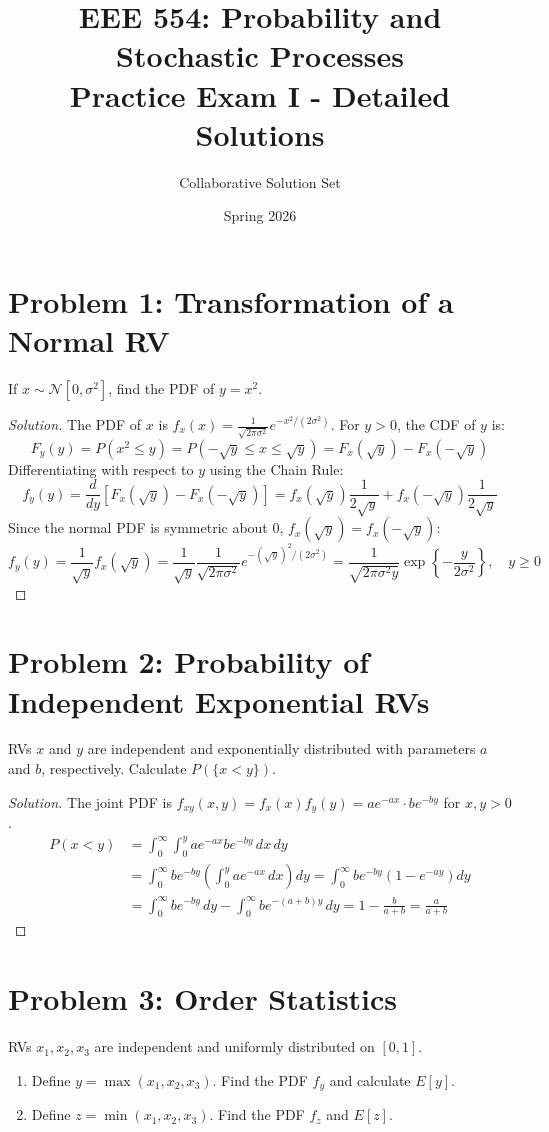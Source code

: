 \documentclass[11pt]{article}
\title{EEE 554: Probability and Stochastic Processes \\ Practice Exam I - Detailed Solutions}
\author{Collaborative Solution Set}
\date{Spring 2026}
\begin{document}
\maketitle

\section*{Problem 1: Transformation of a Normal RV}
If $x \sim \mathcal{N}[0, \sigma^{2}]$, find the PDF of $y = x^{2}$.

\begin{proof}[Solution]
The PDF of $x$ is $f_x(x) = \frac{1}{\sqrt{2\pi\sigma^2}} e^{-x^2 / (2\sigma^2)}$.
For $y > 0$, the CDF of $y$ is:
\[
F_y(y) = P(x^2 \le y) = P(-\sqrt{y} \le x \le \sqrt{y}) = F_x(\sqrt{y}) - F_x(-\sqrt{y})
\]
Differentiating with respect to $y$ using the Chain Rule:
\[
f_y(y) = \frac{d}{dy} [F_x(\sqrt{y}) - F_x(-\sqrt{y})] = f_x(\sqrt{y}) \frac{1}{2\sqrt{y}} + f_x(-\sqrt{y}) \frac{1}{2\sqrt{y}}
\]
Since the normal PDF is symmetric about 0, $f_x(\sqrt{y}) = f_x(-\sqrt{y})$:
\[
f_y(y) = \frac{1}{\sqrt{y}} f_x(\sqrt{y}) = \frac{1}{\sqrt{y}} \frac{1}{\sqrt{2\pi\sigma^2}} e^{-(\sqrt{y})^2 / (2\sigma^2)} = \frac{1}{\sqrt{2\pi\sigma^2 y}} \exp\left\{-\frac{y}{2\sigma^2}\right\}, \quad y \ge 0
\]
\end{proof}

\section*{Problem 2: Probability of Independent Exponential RVs}
RVs $x$ and $y$ are independent and exponentially distributed with parameters $a$ and $b$, respectively. Calculate $P(\{x < y\})$.

\begin{proof}[Solution]
The joint PDF is $f_{xy}(x, y) = f_x(x)f_y(y) = a e^{-ax} \cdot b e^{-by}$ for $x, y > 0$.
\begin{align*}
P(x < y) &= \int_0^\infty \int_0^y a e^{-ax} b e^{-by} \, dx \, dy \\
&= \int_0^\infty b e^{-by} \left( \int_0^y a e^{-ax} \, dx \right) dy = \int_0^\infty b e^{-by} \left( 1 - e^{-ay} \right) dy \\
&= \int_0^\infty b e^{-by} \, dy - \int_0^\infty b e^{-(a+b)y} \, dy = 1 - \frac{b}{a+b} = \frac{a}{a+b}
\end{align*}
\end{proof}

\section*{Problem 3: Order Statistics}
RVs $x_1, x_2, x_3$ are independent and uniformly distributed on $[0, 1]$.
\begin{enumerate}
    \item[(a)] Define $y = \max(x_1, x_2, x_3)$. Find the PDF $f_y$ and calculate $E[y]$.
    \item[(b)] Define $z = \min(x_1, x_2, x_3)$. Find the PDF $f_z$ and $E[z]$.
\end{enumerate}
\end{document}
